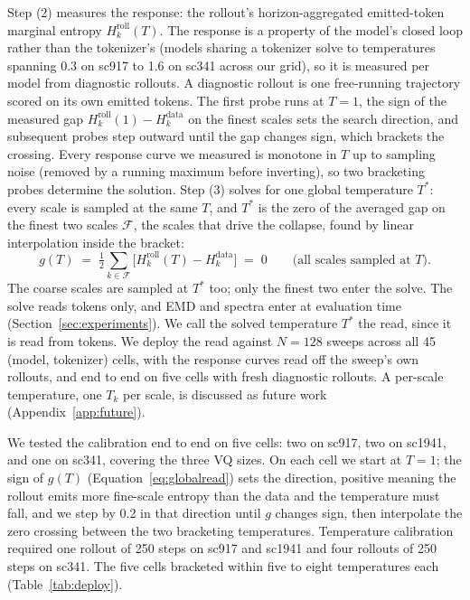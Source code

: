 \documentclass{article}
\begin{document}
Step (2) measures the response: the rollout's horizon-aggregated emitted-token marginal
entropy $H^{\mathrm{roll}}_k(T)$. The response is a property of the model's closed loop
rather than the tokenizer's (models sharing a tokenizer solve to temperatures spanning
0.3 on sc917 to 1.6 on sc341 across our grid), so it is measured per model from
diagnostic rollouts. A diagnostic rollout is one free-running trajectory scored on its
own emitted tokens. The first probe runs at $T{=}1$, the sign of the measured gap $H^{\mathrm{roll}}_k(1) - H^{\mathrm{data}}_k$ on the finest scales sets the search direction, and subsequent probes step outward until the gap changes sign, which brackets the crossing. Every response curve we measured is monotone in $T$ up to sampling noise (removed by a running maximum before inverting), so two bracketing probes determine the solution. Step (3) solves for one global
temperature $T^\ast$: every scale is sampled at the same $T$, and $T^\ast$ is the zero of
the averaged gap on the finest two scales $\mathcal{F}$, the scales that drive the
collapse, found by linear interpolation inside the bracket:
\begin{equation}
g(T) \;=\; \tfrac{1}{2}\textstyle\sum_{k\in\mathcal{F}}
\big[H^{\mathrm{roll}}_k(T) - H^{\mathrm{data}}_k\big] \;=\; 0
\qquad \text{(all scales sampled at $T$)}.
\label{eq:globalread}
\end{equation}
The coarse scales are sampled at $T^\ast$ too; only the finest two enter the solve. The
solve reads tokens only, and EMD and spectra enter at evaluation time
(Section~\ref{sec:experiments}). We call the solved temperature $T^\ast$ the read, since
it is read from tokens. We deploy the read against $N{=}128$ sweeps across all
45 (model, tokenizer) cells, with the response curves read off the sweep's own rollouts,
and end to end on five cells with fresh diagnostic rollouts. A per-scale temperature, one
$T_k$ per scale, is discussed as future work (Appendix~\ref{app:future}).

We tested the calibration end to end on five cells: two on sc917, two on sc1941, and one
on sc341, covering the three VQ sizes. On each cell we start at $T{=}1$; the sign of $g(T)$
(Equation~\ref{eq:globalread}) sets the direction, positive meaning the rollout emits more
fine-scale entropy than the data and the temperature must fall, and we step by 0.2 in
that direction until $g$ changes sign, then interpolate the zero crossing between the two
bracketing temperatures. Temperature calibration required one rollout of 250 steps on sc917 and sc1941 and four rollouts of 250 steps on sc341. The five cells bracketed within five to eight temperatures each
(Table~\ref{tab:deploy}).
\end{document}
